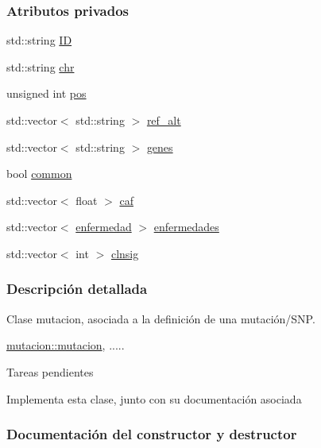\subsubsection*{Atributos privados}
\begin{DoxyCompactItemize}
\item 
std\+::string \hyperlink{classmutacion_a963e5d258723e4d25f9a3b4c8ec99f2a}{ID}
\item 
std\+::string \hyperlink{classmutacion_ab69021961d68dd5232b4bc3f849ddf13}{chr}
\item 
unsigned int \hyperlink{classmutacion_ae1487b8648d0eaad68de5e4e5a87f3ff}{pos}
\item 
std\+::vector$<$ std\+::string $>$ \hyperlink{classmutacion_a79091ce22a92f1994070a37916304d55}{ref\+\_\+alt}
\item 
std\+::vector$<$ std\+::string $>$ \hyperlink{classmutacion_a40212ce0822ff41c32ac82156094af69}{genes}
\item 
bool \hyperlink{classmutacion_a6dabfef6167d64030f095887b15f65dd}{common}
\item 
std\+::vector$<$ float $>$ \hyperlink{classmutacion_aef3fe46b6a2d10e3993703ebd5d5be5f}{caf}
\item 
std\+::vector$<$ \hyperlink{classenfermedad}{enfermedad} $>$ \hyperlink{classmutacion_ac8cca92dea1ab6fb9c193eed55a5ad28}{enfermedades}
\item 
std\+::vector$<$ int $>$ \hyperlink{classmutacion_a0d029eee6925649df15081b780c12e37}{clnsig}
\end{DoxyCompactItemize}


\subsubsection{Descripción detallada}
Clase mutacion, asociada a la definición de una mutación/\+S\+NP. 

\hyperlink{classmutacion_a01cb8b2307eacbfb415f99373ff3c64a}{mutacion\+::mutacion}, .....

\begin{DoxyRefDesc}{Tareas pendientes}
\item[\hyperlink{todo__todo000002}{Tareas pendientes}]Implementa esta clase, junto con su documentación asociada\end{DoxyRefDesc}


\subsubsection{Documentación del constructor y destructor}
